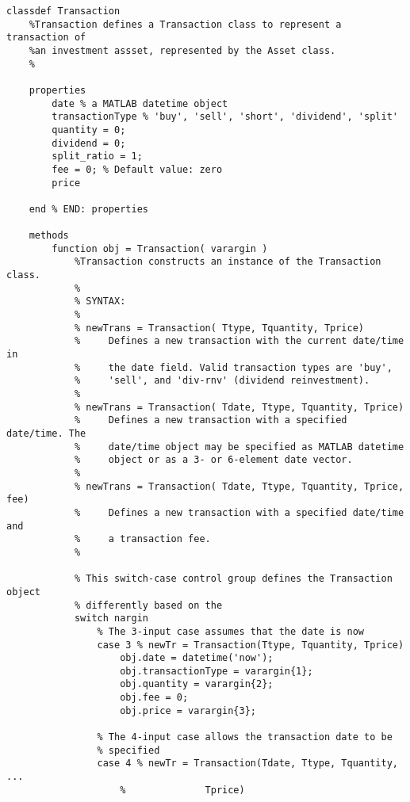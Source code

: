 \begin{lstlisting}[style=Matlab-editor, caption={The \texttt{Transaction} class, as enhanced to support \texttt{Asset} value calculations.}, label={lst:TransactionForCalculations}]
classdef Transaction
    %Transaction defines a Transaction class to represent a transaction of
    %an investment assset, represented by the Asset class.
    %
    
    properties
        date % a MATLAB datetime object
        transactionType % 'buy', 'sell', 'short', 'dividend', 'split'
        quantity = 0;
        dividend = 0;
        split_ratio = 1;
        fee = 0; % Default value: zero
        price
        
    end % END: properties
    
    methods
        function obj = Transaction( varargin )
            %Transaction constructs an instance of the Transaction class.
            %
            % SYNTAX:
            %
            % newTrans = Transaction( Ttype, Tquantity, Tprice)
            %     Defines a new transaction with the current date/time in
            %     the date field. Valid transaction types are 'buy',
            %     'sell', and 'div-rnv' (dividend reinvestment).
            %
            % newTrans = Transaction( Tdate, Ttype, Tquantity, Tprice)
            %     Defines a new transaction with a specified date/time. The
            %     date/time object may be specified as MATLAB datetime
            %     object or as a 3- or 6-element date vector.
            %
            % newTrans = Transaction( Tdate, Ttype, Tquantity, Tprice, fee)
            %     Defines a new transaction with a specified date/time and
            %     a transaction fee.
            %
            
            % This switch-case control group defines the Transaction object
            % differently based on the 
            switch nargin
                % The 3-input case assumes that the date is now
                case 3 % newTr = Transaction(Ttype, Tquantity, Tprice)
                    obj.date = datetime('now');
                    obj.transactionType = varargin{1};
                    obj.quantity = varargin{2};
                    obj.fee = 0;
                    obj.price = varargin{3};
                    
                % The 4-input case allows the transaction date to be
                % specified
                case 4 % newTr = Transaction(Tdate, Ttype, Tquantity, ...
                    %              Tprice)
                    

\end{lstlisting}
